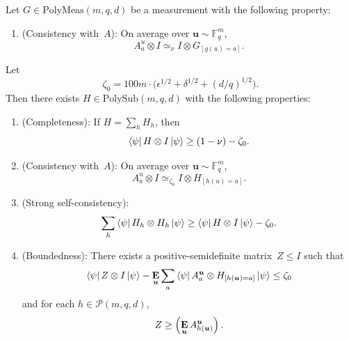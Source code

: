 \documentclass[11pt]{article}
\theoremstyle{definition}
\newcommand{\E}{\mathop{\bf E\/}}
\newcommand{\F}{\mathbb F}
\newcommand{\eps}{\epsilon}
\newcommand{\ot}{\otimes}
\newcommand{\calP}{\mathcal{P}}
\newcommand{\bu}{\boldsymbol{u}}
\newcommand{\polyfunc}[3]{\calP(#1, #2, #3)}
\newcommand{\polymeas}[3]{\mathrm{PolyMeas}(#1, #2, #3)}
\newcommand{\polysub}[3]{\mathrm{PolySub}(#1, #2, #3)}
\begin{document}
\begin{lemma}\label{lem:self-improvement-helper}
Let $G \in \polymeas{m}{q}{d}$ be a measurement with the following property:
\begin{enumerate}
  \item (Consistency with~$A$): \label{item:self-improvement-G-consistency} On average over $\bu \sim \F_q^{m}$,
	  \begin{equation*}
	  A^{u}_a \otimes I \simeq_{\nu} I \otimes G_{[g(u)=a]}.
	  \end{equation*}
	  \end{enumerate}
Let
\begin{equation*}
\zeta_0 = 100m\cdot \Big(\eps^{1/2} + \delta^{1/2} + (d/q)^{1/2}\Big).
\end{equation*}
Then there exists $H \in \polysub{m}{q}{d}$ with the following properties:
\begin{enumerate}
    \item(Completeness):  \label{item:self-improvement-completeness} If $H =  \sum_h H_h$, then
    \begin{equation*}
    \bra{\psi} H \otimes I \ket{\psi} \geq (1-\nu)-\zeta_0.
    \end{equation*}
    \item(Consistency with~$A$):\label{item:self-improvement-A-consistency} On average over $\bu \sim \F_q^m$,
        \begin{equation*}
            A^u_a \otimes I \simeq_{\zeta_0} I \otimes H_{[h(u) = a]}.
        \end{equation*}
    \item(Strong self-consistency): \label{item:self-improvement-self}
	\begin{equation*}
		\sum_{h} \bra{\psi} H_h \ot H_h \ket{\psi} \geq \bra{\psi} H \ot I \ket{\psi} - \zeta_0.
	\end{equation*}
    \item(Boundedness): \label{item:self-improvement-boundedness} There exists a positive-semidefinite matrix~$Z\leq I$ such that
    \begin{equation*}
        \bra{\psi} Z \otimes I \ket{\psi} -\E_{\bu} \sum_a \bra{\psi}  A^{\bu}_{a} \otimes H_{[h(\bu)=a]} \ket{\psi} \leq \zeta_0
    \end{equation*}
    and for each $h \in \polyfunc{m}{q}{d}$,
	\begin{equation*}
	Z \geq \left(\E_{\bu} A^{\bu}_{h(\bu)}\right).
	\end{equation*}
\end{enumerate}
\end{lemma}
\end{document}
